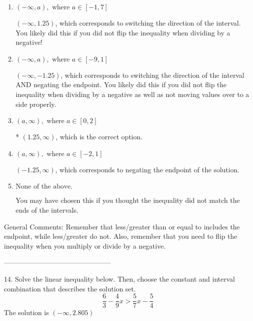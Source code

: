 \documentclass{article}[14pt]
\begin{document}
\begin{enumerate}[label=\Alph*.] 
\item $ (-\infty, a), \text{ where } a \in [-1, 7] $ 

  $(-\infty, 1.25)$, which corresponds to switching the direction of the interval. You likely did this if you did not flip the inequality when dividing by a negative! 
\item $ (-\infty, a), \text{ where } a \in [-9, 1] $ 

  $(-\infty, -1.25)$, which corresponds to switching the direction of the interval AND negating the endpoint. You likely did this if you did not flip the inequality when dividing by a negative as well as not moving values over to a side properly. 
\item $ (a, \infty), \text{ where } a \in [0, 2] $ 

 * $(1.25, \infty)$, which is the correct option. 
\item $ (a, \infty), \text{ where } a \in [-2, 1] $ 

  $(-1.25, \infty)$, which corresponds to negating the endpoint of the solution. 
\item $ \text{None of the above}. $ 

 You may have chosen this if you thought the inequality did not match the ends of the intervals. 
\end{enumerate} 
 
General Comments: Remember that less/greater than or equal to includes the endpoint, while less/greater do not. Also, remember that you need to flip the inequality when you multiply or divide by a negative.

-----------------------------------------------

14. Solve the linear inequality below. Then, choose the constant and interval combination that describes the solution set.
$$ \frac{6}{3} - \frac{4}{9} x > \frac{5}{7} x - \frac{5}{4} $$ 
The solution is $ (-\infty, 2.805) $ 
\end{document}
